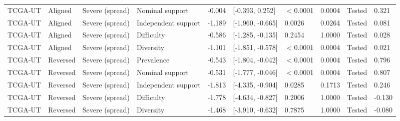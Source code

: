 \begin{longtable}{llllllllll}
TCGA-UT & Aligned & Severe (spread) & Nominal support & -0.004 & [-0.393, 0.252] & $<$0.0001 & 0.0004 & Tested & 0.321 \\
TCGA-UT & Aligned & Severe (spread) & Independent support & -1.189 & [-1.960, -0.665] & 0.0026 & 0.0264 & Tested & 0.081 \\
TCGA-UT & Aligned & Severe (spread) & Difficulty & -0.586 & [-1.285, -0.135] & 0.2454 & 1.0000 & Tested & 0.028 \\
TCGA-UT & Aligned & Severe (spread) & Diversity & -1.101 & [-1.851, -0.578] & $<$0.0001 & 0.0004 & Tested & 0.021 \\
TCGA-UT & Reversed & Severe (spread) & Prevalence & -0.543 & [-1.804, -0.042] & $<$0.0001 & 0.0004 & Tested & 0.796 \\
TCGA-UT & Reversed & Severe (spread) & Nominal support & -0.531 & [-1.777, -0.046] & $<$0.0001 & 0.0004 & Tested & 0.807 \\
TCGA-UT & Reversed & Severe (spread) & Independent support & -1.813 & [-4.335, -0.904] & 0.0285 & 0.1713 & Tested & 0.246 \\
TCGA-UT & Reversed & Severe (spread) & Difficulty & -1.778 & [-4.634, -0.827] & 0.2006 & 1.0000 & Tested & -0.130 \\
TCGA-UT & Reversed & Severe (spread) & Diversity & -1.468 & [-3.910, -0.632] & 0.7875 & 1.0000 & Tested & -0.080 \\
\end{longtable}
